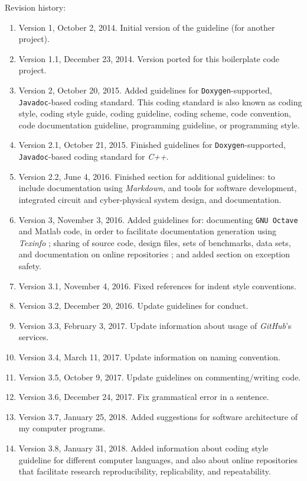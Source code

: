 \documentclass[letter,12pt]{article}
\begin{document}
Revision history: \vspace{-0.3cm}
\begin{enumerate} \itemsep -4pt
\item Version 1, October 2, 2014. Initial version of the guideline (for another project).
\item Version 1.1, December 23, 2014. Version ported for this boilerplate code project.
\item Version 2, October 20, 2015. Added guidelines for {\tt Doxygen}-supported, {\tt Javadoc}-based coding standard. This coding standard is also known as coding style, coding style guide, coding guideline, coding scheme, code convention, code documentation guideline, programming guideline, or programming style.
\item Version 2.1, October 21, 2015. Finished guidelines for {\tt Doxygen}-supported, {\tt Javadoc}-based coding standard for {\it C++}.
\item Version 2.2, June 4, 2016. Finished section for additional guidelines: to include documentation using {\it Markdown}, and tools for software development, integrated circuit and cyber-physical system design, and documentation.
\item Version 3, November 3, 2016. Added guidelines for: documenting {\tt GNU Octave} and {\sc Matlab} code, in order to facilitate documentation generation using {\it Texinfo} \cite{WikipediaContributors2016h,Stallman2016,Stallman2016a,Stallman2016b}; sharing of source code, design files, sets of benchmarks, data sets, and documentation on online repositories \cite{figshareLLPstaff2016,GitHubStaff2016}; and added section on exception safety.
\item Version 3.1, November 4, 2016. Fixed references for indent style conventions.
\item Version 3.2, December 20, 2016. Update guidelines for conduct.
\item Version 3.3, February 3, 2017. Update information about usage of {\it GitHub}'s services.
\item Version 3.4, March 11, 2017. Update information on naming convention.
\item Version 3.5, October 9, 2017. Update guidelines on commenting/writing code.
\item Version 3.6, December 24, 2017. Fix grammatical error in a sentence.
\item Version 3.7, January 25, 2018. Added suggestions for software architecture of my computer programs.
\item Version 3.8, January 31, 2018. Added information about coding style guideline for different computer languages, and also about online repositories that facilitate research reproducibility, replicability, and repeatability.

\end{enumerate}
\end{document}
